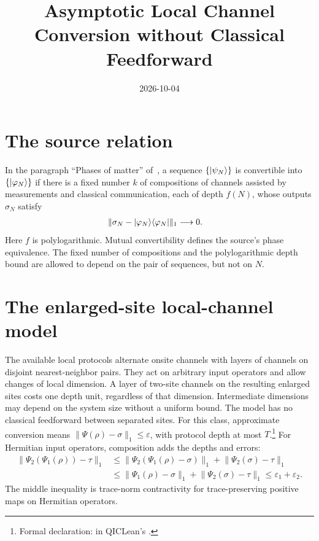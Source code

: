 \documentclass{article}
\title{Asymptotic Local Channel Conversion without Classical Feedforward}
\author{}
\date{2026-10-04}
\begin{document}
\maketitle
{}

\section{The source relation}
In the paragraph ``Phases of matter'' of~\cite{Piroli2021LOCC}, a sequence
$\{|\psi_N\rangle\}$ is convertible into $\{|\varphi_N\rangle\}$ if there is a
fixed number $k$ of compositions of channels assisted by measurements and
classical communication, each of depth $f(N)$, whose outputs $\sigma_N$
satisfy
\begin{align}
    \lVert\sigma_N-|\varphi_N\rangle\langle \varphi_N|\rVert_1 & \longrightarrow 0.
\end{align}
Here $f$ is polylogarithmic. Mutual convertibility defines the source's
phase equivalence. The fixed number of compositions and the polylogarithmic
depth bound are allowed to depend on the pair of sequences, but not on $N$.

\section{The enlarged-site local-channel model}
The available local protocols alternate onsite channels with layers of
channels on disjoint nearest-neighbor pairs. They act on arbitrary input
operators and allow changes of local dimension. A layer of two-site channels
on the resulting enlarged sites costs one depth unit, regardless of that
dimension. Intermediate dimensions may depend on the system size without a
uniform bound. The model has no classical feedforward between separated
sites. For this class, approximate conversion
means $\lVert\Psi(\rho)-\sigma\rVert_1\le\varepsilon$, with protocol depth at
most $T$.\footnote{Formal declaration:
     in
    QICLean's .}
For Hermitian input operators, composition adds the depths and errors:
\begin{align}
    \lVert\Psi_2(\Psi_1(\rho))-\tau\rVert_1
     & \le \lVert\Psi_2(\Psi_1(\rho)-\sigma)\rVert_1
    +\lVert\Psi_2(\sigma)-\tau\rVert_1               \\
     & \le \lVert\Psi_1(\rho)-\sigma\rVert_1
    +\lVert\Psi_2(\sigma)-\tau\rVert_1
    \le\varepsilon_1+\varepsilon_2.
\end{align}
The middle inequality is trace-norm contractivity for trace-preserving
positive maps on Hermitian operators.
\end{document}
